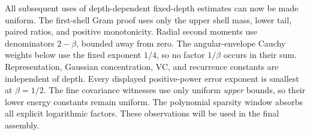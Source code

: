All subsequent uses of depth-dependent fixed-depth estimates can now
be made uniform. The first-shell Gram proof uses only the upper shell
mass, lower tail, paired ratios, and positive monotonicity. Radial
second moments use denominators $2-\beta$, bounded away from zero.
The angular-envelope Cauchy weights below use the fixed exponent
$1/4$, so no factor $1/\beta$ occurs in their sum. Representation,
Gaussian concentration, VC, and recurrence constants are independent
of depth. Every displayed positive-power error exponent is smallest
at $\beta=1/2$. The fine covariance witnesses use only uniform
\emph{upper} bounds, so their lower energy constants remain uniform.
The polynomial sparsity window absorbs all explicit logarithmic
factors. These observations will be used in the final assembly.
